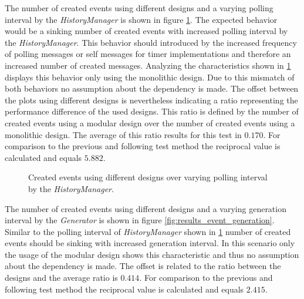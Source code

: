 The number of created events using different designs and a varying polling interval by the \emph{HistoryManager} is shown in figure \ref{fig:results_event_polling}.
The expected behavior would be a sinking number of created events with increased polling interval by the \emph{HistoryManager}.
This behavior should introduced by the increased frequency of polling messages or self messages for timer implementations and therefore an increased number of created messages.
Analyzing the characteristics shown in \ref{fig:results_event_polling} displays this behavior only using the monolithic design.
Due to this mismatch of both behaviors no assumption about the dependency is made.
The offset between the plots using different designs is nevertheless indicating a ratio representing the performance difference of the used designs.
This ratio is defined by the number of created events using a modular design over the number of created events using a monolithic design.
The average of this ratio results for this test in $0.170$.
For comparison to the previous and following test method the reciprocal value is calculated and equals $5.882$.
\\

\begin{figure}
    \centering
    \caption{Created events using different designs over varying polling interval by the \emph{HistoryManager}.}
    \label{fig:results_event_polling}
\end{figure}

The number of created events using different designs and a varying generation interval by the \emph{Generator} is shown in figure \ref{fig:results_event_generation}.
Similar to the polling interval of \emph{HistoryManager} shown in \ref{fig:results_event_polling} number of created events should be sinking with increased generation interval.
In this scenario only the usage of the modular design shows this characteristic and thus no assumption about the dependency is made.
The offset is related to the ratio between the designs and the average ratio is $0.414$.
For comparison to the previous and following test method the reciprocal value is calculated and equals $2.415$.
\\

